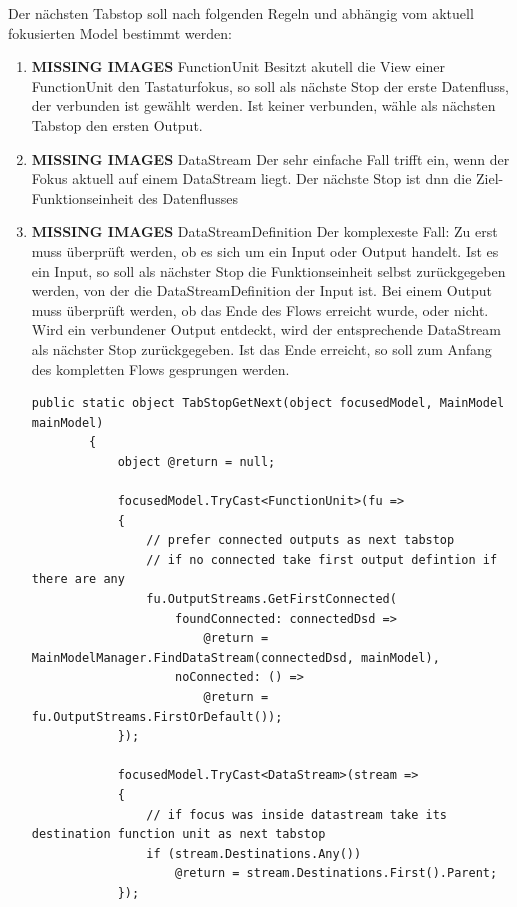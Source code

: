 \documentclass[11pt]{article}
\begin{document}
Der nächsten Tabstop soll nach folgenden Regeln und abhängig vom aktuell
fokusierten Model bestimmt werden:

\begin{enumerate}
\item {\bfseries\sffamily MISSING IMAGES} FunctionUnit
\label{sec:orgheadline27}
Besitzt akutell die View einer FunctionUnit den Tastaturfokus, so soll als
nächste Stop der erste Datenfluss, der verbunden ist gewählt werden. Ist keiner
verbunden, wähle als nächsten Tabstop den ersten Output.

\item {\bfseries\sffamily MISSING IMAGES} DataStream
\label{sec:orgheadline28}
Der sehr einfache Fall trifft ein, wenn der Fokus aktuell auf einem
DataStream liegt. Der nächste Stop ist dnn die Ziel-Funktionseinheit des Datenflusses

\item {\bfseries\sffamily MISSING IMAGES} DataStreamDefinition
\label{sec:orgheadline29}
Der komplexeste Fall: 
Zu erst muss überprüft werden, ob es sich um ein Input oder Output
handelt. Ist es ein Input, so soll als nächster Stop die Funktionseinheit
selbst zurückgegeben werden, von der die DataStreamDefinition der Input ist. 
Bei einem Output muss überprüft werden, ob das Ende des Flows erreicht
wurde, oder nicht. Wird ein verbundener Output entdeckt, wird der
entsprechende DataStream als nächster Stop zurückgegeben. Ist das Ende
erreicht, so soll zum Anfang des kompletten Flows gesprungen werden.

\begin{verbatim}
public static object TabStopGetNext(object focusedModel, MainModel mainModel)
        {
            object @return = null;

            focusedModel.TryCast<FunctionUnit>(fu =>
            {
                // prefer connected outputs as next tabstop
                // if no connected take first output defintion if there are any
                fu.OutputStreams.GetFirstConnected(
                    foundConnected: connectedDsd => 
                        @return = MainModelManager.FindDataStream(connectedDsd, mainModel),
                    noConnected: () => 
                        @return = fu.OutputStreams.FirstOrDefault());
            });

            focusedModel.TryCast<DataStream>(stream =>
            {
                // if focus was inside datastream take its destination function unit as next tabstop
                if (stream.Destinations.Any())
                    @return = stream.Destinations.First().Parent;
            });


\end{verbatim}
\end{enumerate}
\end{document}
